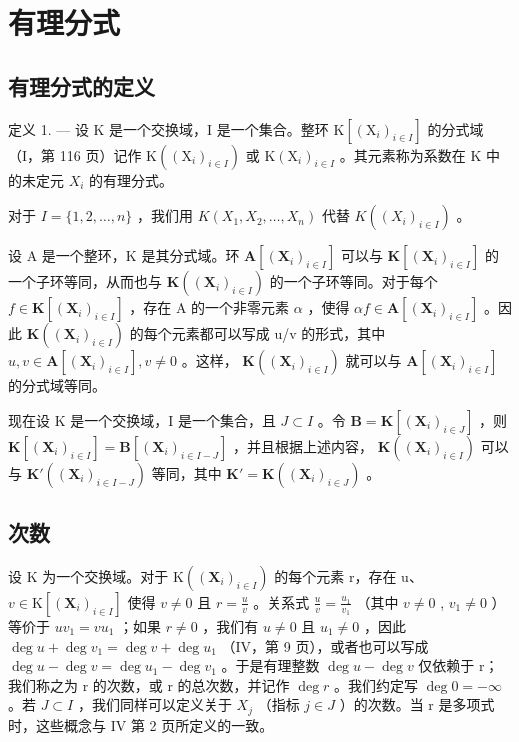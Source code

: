 \section{有理分式}

\subsection{有理分式的定义}

定义 1. --- 设 K 是一个交换域，I 是一个集合。整环 \(\mathrm{K}[(\mathrm{X}_{i})_{i\in I}]\) 的分式域（I，第 116 页）记作 \(\mathrm{K}((\mathrm{X}_{i})_{i\in I})\) 或 \(\mathrm{K}(\mathrm{X}_{i})_{i\in I}\) 。其元素称为系数在 K 中的未定元 \(X_{i}\) 的有理分式。

对于 \(I = \{1, 2, \dots, n\}\) ，我们用 \(K(X_1, X_2, \dots, X_n)\) 代替 \(K((X_i)_{i \in I})\) 。

设 A 是一个整环，K 是其分式域。环 \(\mathbf{A}[(\mathbf{X}_{i})_{i\in I}]\) 可以与 \(\mathbf{K}[(\mathbf{X}_{i})_{i\in I}]\) 的一个子环等同，从而也与 \(\mathbf{K}((\mathbf{X}_{i})_{i\in I})\) 的一个子环等同。对于每个 \(f\in\mathbf{K}[(\mathbf{X}_{i})_{i\in I}]\) ，存在 A 的一个非零元素 \(\alpha\) ，使得 \(\alpha f\in\mathbf{A}[(\mathbf{X}_{i})_{i\in I}]\) 。因此 \(\mathbf{K}((\mathbf{X}_{i})_{i\in I})\) 的每个元素都可以写成 u/v 的形式，其中 \(u,v\in\mathbf{A}[(\mathbf{X}_{i})_{i\in I}],v\neq0\) 。这样， \(\mathbf{K}((\mathbf{X}_{i})_{i\in I})\) 就可以与 \(\mathbf{A}[(\mathbf{X}_{i})_{i\in I}]\) 的分式域等同。

现在设 K 是一个交换域，I 是一个集合，且 \(J \subset I\) 。令 \(\mathbf{B} = \mathbf{K}[(\mathbf{X}_i)_{i \in J}]\) ，则 \(\mathbf{K}[(\mathbf{X}_i)_{i \in I}] = \mathbf{B}[(\mathbf{X}_i)_{i \in I-J}]\) ，并且根据上述内容， \(\mathbf{K}((\mathbf{X}_i)_{i \in I})\) 可以与 \(\mathbf{K}'((\mathbf{X}_i)_{i \in I-J})\) 等同，其中 \(\mathbf{K}' = \mathbf{K}((\mathbf{X}_i)_{i \in J})\) 。

\subsection{次数}

设 K 为一个交换域。对于 \(\mathrm{K}((\mathbf{X}_{i})_{i\in I})\) 的每个元素 r，存在 u、 \(v\in\mathrm{K}[(\mathbf{X}_{i})_{i\in I}]\) 使得 \(v\neq0\) 且 \(r=\frac{u}{v}\) 。关系式 \(\frac{u}{v}=\frac{u_{1}}{v_{1}}\) （其中 \(v\neq0\) , \(v_{1}\neq0\) ）等价于 \(uv_{1}=vu_{1}\) ；如果 \(r\neq0\) ，我们有 \(u\neq0\) 且 \(u_{1}\neq0\) ，因此 \(\deg u+\deg v_{1}=\deg v+\deg u_{1}\) （IV，第 9 页），或者也可以写成 \(\deg u-\deg v=\deg u_{1}-\deg v_{1}\) 。于是有理整数 \(\deg u-\deg v\) 仅依赖于 r；我们称之为 r 的次数，或 r 的总次数，并记作 \(\deg r\) 。我们约定写 \(\deg0=-\infty\) 。若 \(J\subset I\) ，我们同样可以定义关于 \(X_{j}\) （指标 \(j\in J\) ）的次数。当 r 是多项式时，这些概念与 IV 第 2 页所定义的一致。


